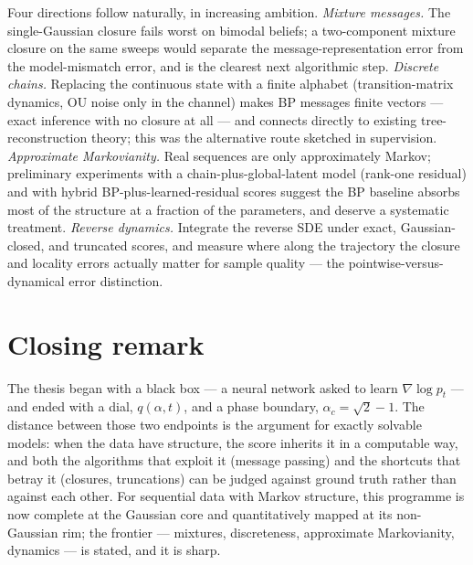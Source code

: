 Four directions follow naturally, in increasing ambition.
\emph{Mixture messages.} The single-Gaussian closure fails worst on
bimodal beliefs; a two-component mixture closure on the same sweeps would
separate the message-representation error from the model-mismatch error,
and is the clearest next algorithmic step.
\emph{Discrete chains.} Replacing the continuous state with a finite
alphabet (transition-matrix dynamics, OU noise only in the channel) makes
BP messages finite vectors --- exact inference with no closure at all ---
and connects directly to existing tree-reconstruction theory; this was the
alternative route sketched in supervision.
\emph{Approximate Markovianity.} Real sequences are only approximately
Markov; preliminary experiments with a chain-plus-global-latent model
(rank-one residual) and with hybrid BP-plus-learned-residual scores
suggest the BP baseline absorbs most of the structure at a fraction of the
parameters, and deserve a systematic treatment.
\emph{Reverse dynamics.} Integrate the reverse SDE under exact,
Gaussian-closed, and truncated scores, and measure where along the
trajectory the closure and locality errors actually matter for sample
quality --- the pointwise-versus-dynamical error distinction.

\section{Closing remark}

The thesis began with a black box --- a neural network asked to learn
$\nabla \log p_t$ --- and ended with a dial, $q(\alpha, t)$, and a phase
boundary, $\alpha_c = \sqrt{2} - 1$. The distance between those two
endpoints is the argument for exactly solvable models: when the data have
structure, the score inherits it in a computable way, and both the
algorithms that exploit it (message passing) and the shortcuts that betray
it (closures, truncations) can be judged against ground truth rather than
against each other. For sequential data with Markov structure, this
programme is now complete at the Gaussian core and quantitatively mapped
at its non-Gaussian rim; the frontier --- mixtures, discreteness,
approximate Markovianity, dynamics --- is stated, and it is sharp.
